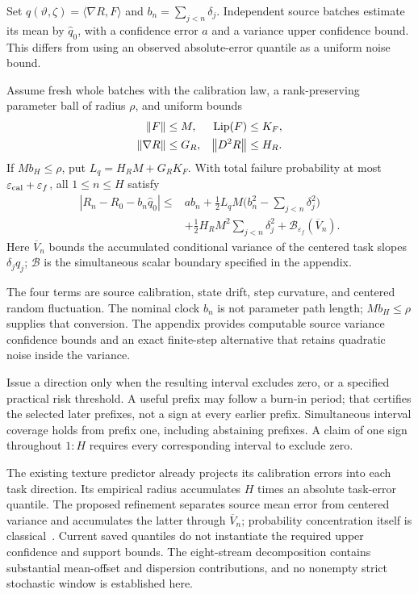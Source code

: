 Set $q(\vartheta,\zeta)=\langle\nabla R,F\rangle$ and $b_n=\sum_{j<n}\delta_j$. Independent source batches estimate its mean by $\widehat q_0$, with a confidence error $a$ and a variance upper confidence bound. This differs from using an observed absolute-error quantile as a uniform noise bound.
\begin{proposition}
\label{prop:stoch-prefix}
Assume fresh whole batches with the calibration law, a rank-preserving parameter ball of radius $\rho$, and uniform bounds
\begin{align}
 \left\lVert F\right\rVert&\le M,&\operatorname{Lip}(F)&\le K_F,\nonumber\\
 \left\lVert \nabla R\right\rVert&\le G_R,&\left\lVert D^2R\right\rVert&\le H_R.
\end{align}
If $Mb_H\le\rho$, put $L_q=H_RM+G_RK_F$. With total failure probability at most $\varepsilon_{\rm cal}+\varepsilon_f$, all $1\le n\le H$ satisfy
\begin{align}
 |R_n-R_0-b_n\widehat q_0|\le{}&a b_n
 +\tfrac12L_qM\big(b_n^2-\sum_{j<n}\delta_j^2\big)\nonumber\\
 &+\tfrac12H_RM^2\sum_{j<n}\delta_j^2
 +\mathcal B_{\varepsilon_f}(\overline V_n).
 \label{eq:stoch-four-errors}
\end{align}
Here $\overline V_n$ bounds the accumulated conditional variance of the centered task slopes $\delta_jq_j$; $\mathcal B$ is the simultaneous scalar boundary specified in the appendix.
\end{proposition}
The four terms are source calibration, state drift, step curvature, and centered random fluctuation. The nominal clock $b_n$ is not parameter path length; $Mb_H\le\rho$ supplies that conversion. The appendix provides computable source variance confidence bounds and an exact finite-step alternative that retains quadratic noise inside the variance.

Issue a direction only when the resulting interval excludes zero, or a specified practical risk threshold. A useful prefix may follow a burn-in period; that certifies the selected later prefixes, not a sign at every earlier prefix. Simultaneous interval coverage holds from prefix one, including abstaining prefixes. A claim of one sign throughout $1{:}H$ requires every corresponding interval to exclude zero.

The existing texture predictor already projects its calibration errors into each task direction. Its empirical radius accumulates $H$ times an absolute task-error quantile. The proposed refinement separates source mean error from centered variance and accumulates the latter through $\overline V_n$; probability concentration itself is classical~\cite{freedman1975tail,howard2020timeuniform}. Current saved quantiles do not instantiate the required upper confidence and support bounds. The eight-stream decomposition contains substantial mean-offset and dispersion contributions, and no nonempty strict stochastic window is established here.
